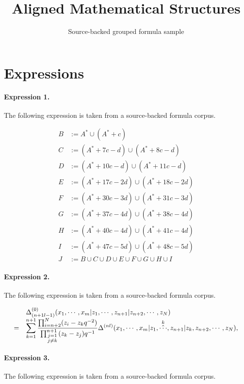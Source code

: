\documentclass[11pt]{article}
\title{Aligned Mathematical Structures}
\author{Source-backed grouped formula sample}
\date{}
\begin{document}
\maketitle
\section{Expressions}
\paragraph{Expression 1.} The following expression is taken from a source-backed formula corpus.

\begin{align*}B&:= A^\ast\cup (A^\ast+c)\\C&:=(A^\ast+7c-d)\cup (A^\ast+8c-d)\\D&:=(A^\ast+10c-d)\cup(A^\ast+11c-d)\\E&:=(A^\ast+17c-2d)\cup(A^\ast+18c-2d)\\F&:=(A^\ast+30c-3d)\cup(A^\ast+31c-3d)\\G&:=(A^\ast+37c-4d)\cup(A^\ast+38c-4d)\\H&:=(A^\ast+40c-4d)\cup(A^\ast+41c-4d)\\I&:=(A^\ast+47c-5d)\cup(A^\ast+48c-5d)\\J&:=B\cup C\cup D\cup E\cup F\cup G\cup H\cup I\end{align*}

\paragraph{Expression 2.} The following expression is taken from a source-backed formula corpus.

\begin{align*}\begin{array}{cl}&\Delta_{(n+1 l-1)}^{(0)}(x_1,\cdots,x_m|z_1,\cdots,z_{n+1}|z_{n+2},\cdots,z_N) \\=&\displaystyle\sum_{k=1}^{n+1}\frac{\prod_{i=n+2}^{N}(z_i-z_k q^{-2})}{\prod_{\scriptstyle{j=1}\atop \scriptstyle{j\ne k}}^{n+1} (z_k-z_j)q^{-1}}\Delta^{(n l)}(x_1,\cdots,x_m|z_1,\mathop{\hat{\cdots}}^{k},z_{n+1}|z_k, z_{n+2},\cdots,z_N), \end{array}\end{align*}

\paragraph{Expression 3.} The following expression is taken from a source-backed formula corpus.
\end{document}
